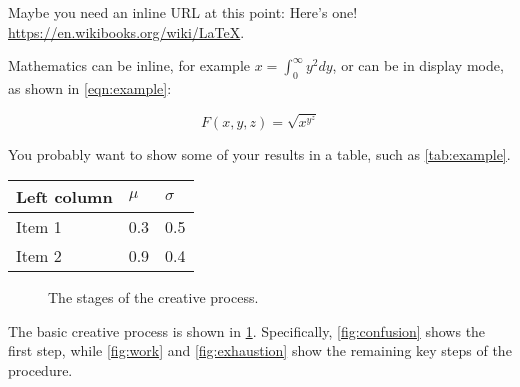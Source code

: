 Maybe you need an inline URL at this point: Here's one! \url{https://en.wikibooks.org/wiki/LaTeX}.

Mathematics can be inline, for example $x = \int_0^\infty y^2 dy$, or can be in display mode, as shown in \eqref{eqn:example}:

\begin{equation}
\label{eqn:example}
F(x,y,z) = \sqrt{x^{y^z}}
\end{equation}

You probably want to show some of your results in a table, such as \tablename{} \ref{tab:example}.

\begin{table*}
\centering
\caption{Table captions normally go at the top.}
\label{tab:example}
\begin{tabular}{p{}p{}p{}}
\toprule
{\bf Left column}	&{\bf $\mu$}	&{\bf $\sigma$}\\
\midrule
Item 1				&0.3			&0.5\\
Item 2				&0.9			&0.4\\
\bottomrule
\end{tabular}
\end{table*}

\begin{figure}
\centering
{}
\caption{The stages of the creative process.}
\label{fig:creative_process}
\end{figure}

The basic creative process is shown in \figurename{} \ref{fig:creative_process}. Specifically, \figurename{} \ref{fig:confusion} shows the first step, while \figurename{} \ref{fig:work} and \ref{fig:exhaustion} show the remaining key steps of the procedure.

